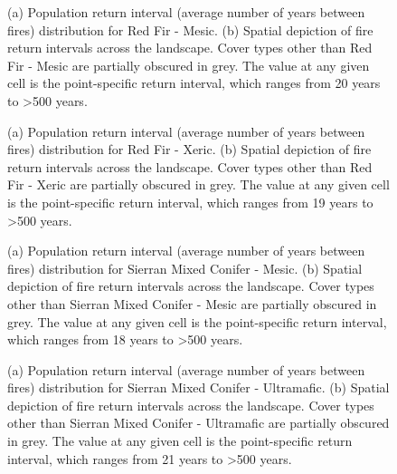 \begin{figure}[!htbp]
  \centering
  \caption{(a) Population return interval (average number of years between fires) distribution for Red Fir - Mesic.  (b) Spatial depiction of fire return intervals across the landscape. Cover types other than Red Fir - Mesic are partially obscured in grey. The value at any given cell is the point-specific return interval, which ranges from 20 years to \textgreater 500 years.}
\label{fig:preturn_rfrm}
\end{figure}

\begin{figure}[!htbp]
  \centering
  \caption{(a) Population return interval (average number of years between fires) distribution for Red Fir - Xeric.  (b) Spatial depiction of fire return intervals across the landscape. Cover types other than Red Fir - Xeric are partially obscured in grey. The value at any given cell is the point-specific return interval, which ranges from 19 years to \textgreater 500 years.}
\label{fig:preturn_rfrx}
\end{figure}

\begin{figure}[!htbp]
  \centering
  \caption{(a) Population return interval (average number of years between fires) distribution for Sierran Mixed Conifer - Mesic.  (b) Spatial depiction of fire return intervals across the landscape. Cover types other than Sierran Mixed Conifer - Mesic are partially obscured in grey. The value at any given cell is the point-specific return interval, which ranges from 18 years to \textgreater 500 years.}
\label{fig:preturn_smcm}
\end{figure}

\begin{figure}[!htbp]
  \centering
  \caption{(a) Population return interval (average number of years between fires) distribution for Sierran Mixed Conifer - Ultramafic.  (b) Spatial depiction of fire return intervals across the landscape. Cover types other than Sierran Mixed Conifer - Ultramafic are partially obscured in grey. The value at any given cell is the point-specific return interval, which ranges from 21 years to \textgreater 500 years.}
\label{fig:preturn_smcu}
\end{figure}

